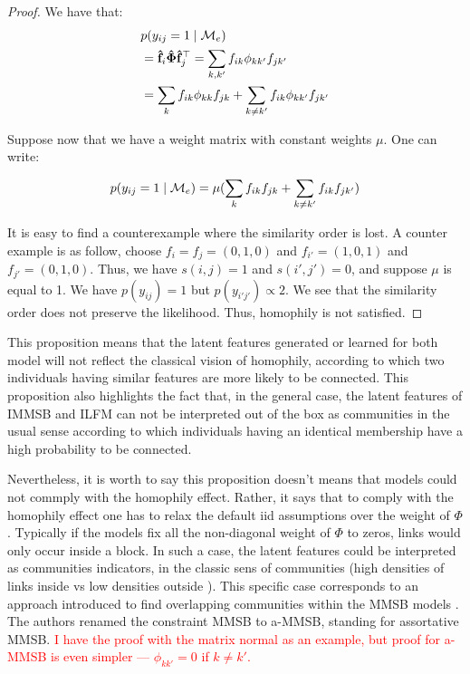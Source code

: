 \begin{proof}
We have that:
\begin{align}
&p(y_{ij}=1 \mid \mathcal{M}_e) \nonumber \\
&=  \mathbf{\hat{f}}_{i} \mathbf{\hat{\Phi}} \mathbf{\hat{f}}_j^\top \nonumber = \sum_{k,k'} f_{ik}\phi_{kk'}f_{jk'}   \nonumber \\
&= \sum_k f_{ik}\phi_{kk}f_{jk} + \sum_{k\neq k'} f_{ik}\phi_{kk'}f_{jk'} \nonumber
\end{align}

 Suppose now that we have a weight matrix with constant weights $\mu$. One can write:

\begin{equation}
    p(y_{ij}=1 \mid \mathcal{M}_e)= \mu (\sum_k f_{ik}f_{jk} + \sum_{k\neq k'} f_{ik}f_{jk'} ) \nonumber
\end{equation}

It is easy to find a counterexample where the similarity order is lost. A counter example is as follow, choose $f_i=f_j=(0,1,0)$ and $f_{i'}=(1,0,1)$ and $f_{j'}=(0,1,0)$. Thus,  we have $s(i,j)=1$ and $s(i',j')=0$, and suppose $\mu$ is equal to 1. We have  $p(y_{ij}) = 1$ but $p(y_{i'j'}) \propto 2$. We see that the similarity order does not preserve the likelihood. Thus, homophily is not satisfied. 
\end{proof} 



This proposition means that the latent features generated or learned for both model will not reflect the classical vision of homophily, according to which two individuals having similar features are more  likely to be connected. This proposition also highlights the fact that, in the general case,  the latent features of IMMSB and ILFM can not be interpreted out of the box as communities in the usual sense according to which  individuals having an identical membership have a high probability to be connected.

Nevertheless, it is worth to say this proposition doesn't means that models could not commply with the homophily effect. Rather, it says that to comply with the homophily effect one has  to relax the default iid assumptions over the weight of  $\Phi$. Typically if the models fix all the non-diagonal weight of $\Phi$ to zeros, links would only occur inside a block. In such a case, the latent features could be interpreted as communities indicators, in the classic sens of communities (high densities of links inside vs low densities outside ). This  specific case corresponds to an approach introduced to find overlapping communities within the MMSB models \cite{AMMSB}. The authors renamed the constraint MMSB to a-MMSB, standing for assortative MMSB. \textcolor{red}{I have the proof with the matrix normal as an example, but proof for a-MMSB is even simpler --- $\phi_{kk'}=0$ if $k\neq k'$.}

